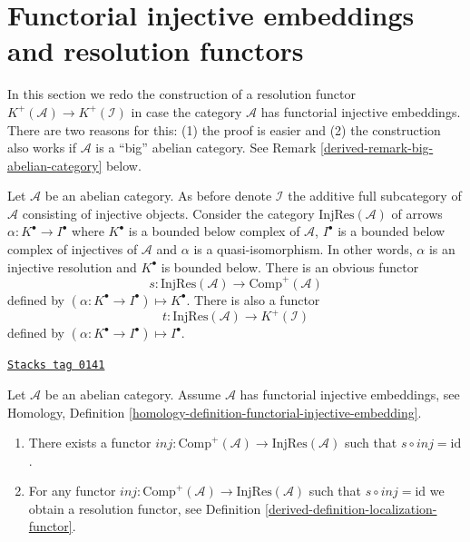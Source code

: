 \section{Functorial injective embeddings and resolution functors}
\label{derived-section-functorial-injective-resolutions}
In this section we redo the construction of a resolution functor
$K^{+}(\mathcal{A}) \to K^{+}(\mathcal{I})$ in case the
category $\mathcal{A}$ has functorial injective embeddings.
There are two reasons for this: (1) the proof is easier and (2)
the construction also works if $\mathcal{A}$ is a ``big'' abelian
category. See
Remark \ref{derived-remark-big-abelian-category}
below.

\medskip\noindent
Let $\mathcal{A}$ be an abelian category. As before denote $\mathcal{I}$
the additive full subcategory of $\mathcal{A}$ consisting of injective
objects. Consider the category $\text{InjRes}(\mathcal{A})$
of arrows $\alpha : K^\bullet \to I^\bullet$
where $K^\bullet$ is a bounded below complex of $\mathcal{A}$,
$I^\bullet$ is a bounded below complex of injectives of $\mathcal{A}$
and $\alpha$ is a quasi-isomorphism. In other words, $\alpha$ is
an injective resolution and $K^\bullet$ is bounded below.
There is an obvious functor
$$
s : \text{InjRes}(\mathcal{A}) \longrightarrow \text{Comp}^{+}(\mathcal{A})
$$
defined by $(\alpha : K^\bullet \to I^\bullet) \mapsto K^\bullet$.
There is also a functor
$$
t : \text{InjRes}(\mathcal{A}) \longrightarrow K^{+}(\mathcal{I})
$$
defined by $(\alpha : K^\bullet \to I^\bullet) \mapsto I^\bullet$.

\begin{lemma}
\label{derived-lemma-functorial-injective-resolutions}
\href{https://stacks.math.columbia.edu/tag/0141}{\texttt{Stacks tag 0141}}

Let $\mathcal{A}$ be an abelian category.
Assume $\mathcal{A}$ has functorial injective embeddings, see
Homology, Definition \ref{homology-definition-functorial-injective-embedding}.
\begin{enumerate}
\item There exists a functor
$inj : \text{Comp}^{+}(\mathcal{A}) \to \text{InjRes}(\mathcal{A})$
such that $s \circ inj = \text{id}$.
\item For any functor
$inj : \text{Comp}^{+}(\mathcal{A}) \to \text{InjRes}(\mathcal{A})$
such that $s \circ inj = \text{id}$ we obtain a resolution functor, see
Definition \ref{derived-definition-localization-functor}.
\end{enumerate}
\end{lemma}

